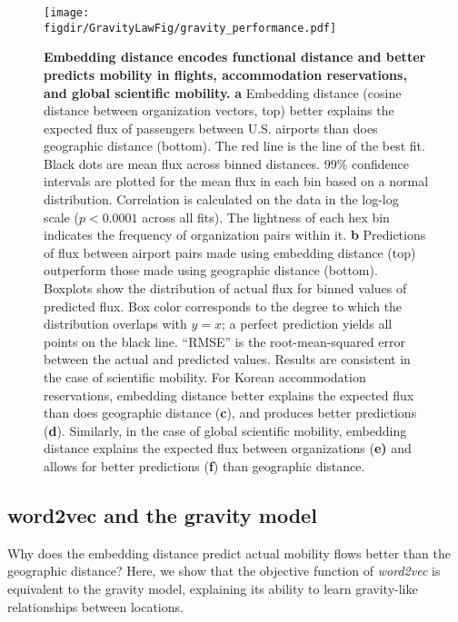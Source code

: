 \documentclass[12pt]{article} %
\def\figdir{../Figs}
\begin{document}
%
%
\begin{figure}[h!]
	\centering
	\texttt{[image: \\figdir/GravityLawFig/gravity\_performance.pdf]}
	\caption{
		\textbf{Embedding distance encodes functional distance and better predicts mobility in flights, accommodation reservations, and global scientific mobility.}
		\textbf{a} Embedding distance (cosine distance between organization vectors, top) better explains the expected flux of passengers between U.S. airports than does geographic distance (bottom).
		The red line is the line of the best fit.
		Black dots are mean flux across binned distances.
		99\% confidence intervals are plotted for the mean flux in each bin based on a normal distribution.
		Correlation is calculated on the data in the log-log scale ($p < 0.0001$ across all fits).
		The lightness of each hex bin indicates the frequency of organization pairs within it.
		\textbf{b} Predictions of flux between airport pairs made using embedding distance (top) outperform those made using geographic distance (bottom).
		Boxplots show the distribution of actual flux for binned values of predicted flux.
		Box color corresponds to the degree to which the distribution overlaps with $y = x$;
		a perfect prediction yields all points on the black line.
		``RMSE'' is the root-mean-squared error between the actual and predicted values.
		Results are consistent in the case of scientific mobility.
		For Korean accommodation reservations, embedding distance better explains the expected flux than does geographic distance (\textbf{c}), and produces better predictions (\textbf{d}).
		Similarly, in the case of global scientific mobility, embedding distance explains the expected flux between organizations (\textbf{e)} and allows for better predictions (\textbf{f}) than geographic distance.
	}
	\label{fig:gravity_performance}
\end{figure}



\subsection*{word2vec and the gravity model}

Why does the embedding distance predict actual mobility flows better than the geographic distance?
Here, we show that the objective function of {\it word2vec} is equivalent to the gravity model, explaining its ability to learn gravity-like relationships between locations. 
\end{document}
